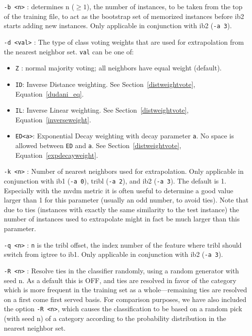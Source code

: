 \documentclass{report}
\begin{document}
\begin{description}
\item {\tt -b <n>} : determines n ($\geq 1$), the number of instances,
to be taken from the top of the training file, to act as the bootstrap
set of memorized instances before {\sc ib2} starts adding new
instances. Only applicable in conjunction with {\sc ib2} ({\tt -a 3}).

\item {\tt -d <val>} : The type of class voting weights that are used for
extrapolation from the nearest neighbor set. {\tt val} can be one of:
	\begin{itemize} 
  	\item {\tt Z} : normal majority voting; all neighbors have
         equal weight (default).
  	\item {\tt ID}: Inverse Distance weighting. See Section~\ref{distweightvote}, Equation~\ref{dudani_eq}.
  	\item {\tt IL}: Inverse Linear weighting. See Section~\ref{distweightvote}, Equation~\ref{inverseweight}.
  	\item {\tt ED<a>}: Exponential Decay weighting with decay parameter {\tt a}. No space is allowed between {\tt ED} and {\tt a}. See Section~\ref{distweightvote}, Equation~\ref{expdecayweight}.
\end{itemize}

\item {\tt -k <n>} : Number of nearest neighbors used for
extrapolation. Only applicable in conjunction with {\sc ib1} ({\tt -a
0}), {\sc tribl} ({\tt -a 2}), and {\sc ib2} ({\tt -a 3}). The default
is 1. Especially with the {\sc mvdm} metric it is often useful to
determine a good value larger than 1 for this parameter (usually an
odd number, to avoid ties). Note that due to ties (instances with
exactly the same similarity to the test instance) the number of
instances used to extrapolate might in fact be much larger than this
parameter.

\item {\tt -q <n>} : {\tt n} is the {\sc tribl} offset, the index
number of the feature where {\sc tribl} should switch from {\sc
igtree} to {\sc ib1}. Only applicable in conjunction with {\sc ib2}
({\tt -a 3}).

\item {\tt -R <n>} : Resolve ties in the classifier randomly, using a
random generator with seed n. As a default this is OFF, and ties are
resolved in favor of the category which is more frequent in the
training set as a whole---remaining ties are resolved on a first come
first served basis. For comparison purposes, we have also included the
option {\tt -R <n>}, which causes the classification to be based on
a random pick (with seed n) of a category according to the probability
distribution in the nearest neighbor set.


\end{description}
\end{document}
